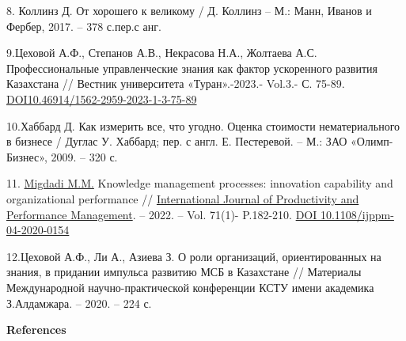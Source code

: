 \begin{references}
8. Коллинз Д. От хорошего к великому / Д. Коллинз -- М.: Манн, Иванов и
Фербер, 2017. -- 378 с.пер.с анг.

9.Цеховой А.Ф., Степанов А.В., Некрасова Н.А., Жолтаева А.С.
Профессиональные управленческие знания как фактор ускоренного развития
Казахстана // Вестник университета «Туран».-2023.- Vol.3.- С. 75-89.
\href{https://doi.org/10.46914/1562-2959-2023-1-3-75-89}{DOI10.46914/1562-2959-2023-1-3-75-89}

10.Хаббард Д. Как измерить все, что угодно. Оценка стоимости
нематериального в бизнесе / Дуглас У. Хаббард; пер. с англ. Е.
Пестеревой. -- М.: ЗАО «Олимп-Бизнес», 2009. -- 320 с.

11. \href{https://www.emerald.com/insight/search?q=Mahmoud\%20Mohammad\%20Migdadi}{Migdadi
M.M.} Knowledge management processes: innovation capability and
organizational performance //
\href{https://www.emerald.com/insight/publication/issn/1741-0401}{International
Journal of Productivity and Performance Management}. -- 2022. -- Vol.
71(1)- P.182-210. \href{https://doi.org/10.1108/ijppm-04-2020-0154}{DOI
10.1108/ijppm-04-2020-0154}

12.Цеховой А.Ф., Ли А., Азиева З. О роли организаций, ориентированных на
знания, в придании импульса развитию МСБ в Казахстане // Материалы
Международной научно-практической конференции КСТУ имени академика
З.Алдамжара. -- 2020. -- 224 с.
\end{references}

\begin{center}
{\bfseries References}
\end{center}

